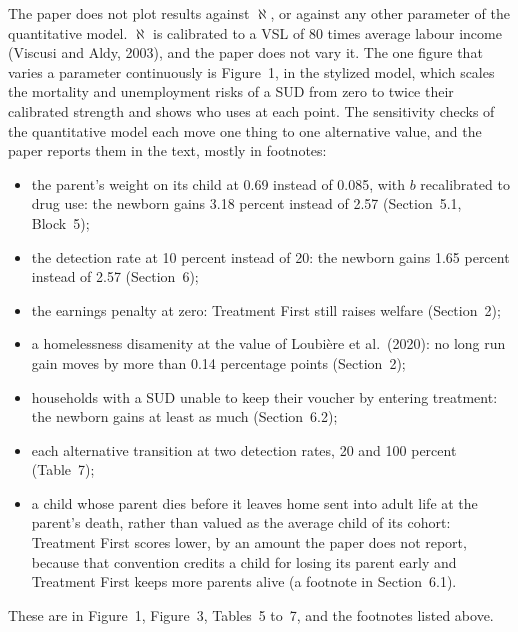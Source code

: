\documentclass[11pt]{article}
\begin{document}
\begin{response}
\open The paper does not plot results against $\aleph$, or against any other
parameter of the quantitative model. $\aleph$ is calibrated to a VSL of 80 times
average labour income (Viscusi and Aldy, 2003), and the paper does not vary it. The one
figure that varies a parameter continuously is Figure~1, in the stylized model, which
scales the mortality and unemployment risks of a SUD from zero to twice their
calibrated strength and shows who uses at each point. The sensitivity checks of the
quantitative model each move one thing to one alternative value, and the paper
reports them in the text, mostly in footnotes:
\begin{itemize}
\item the parent's weight on its child at 0.69 instead of 0.085, with $b$ recalibrated to
drug use: the newborn gains 3.18 percent instead of 2.57 (Section~5.1, Block~5);
\item the detection rate at 10 percent instead of 20: the newborn gains 1.65 percent
instead of 2.57 (Section~6);
\item the earnings penalty at zero: Treatment First still raises welfare (Section~2);
\item a homelessness disamenity at the value of Loubi\`ere et al.\ (2020): no long run
gain moves by more than 0.14 percentage points (Section~2);
\item households with a SUD unable to keep their voucher by entering treatment: the
newborn gains at least as much (Section~6.2);
\item each alternative transition at two detection rates, 20 and 100 percent
(Table~7);
\item a child whose parent dies before it leaves home sent into adult life at the
parent's death, rather than valued as the average child of its cohort: Treatment First
scores lower, by an amount the paper does not report, because that convention credits
a child for losing its parent early and Treatment First keeps more parents alive (a
footnote in Section~6.1).
\end{itemize}

These are in Figure~1, Figure~3, Tables~5 to~7, and the footnotes listed above.
\end{response}
\end{document}
